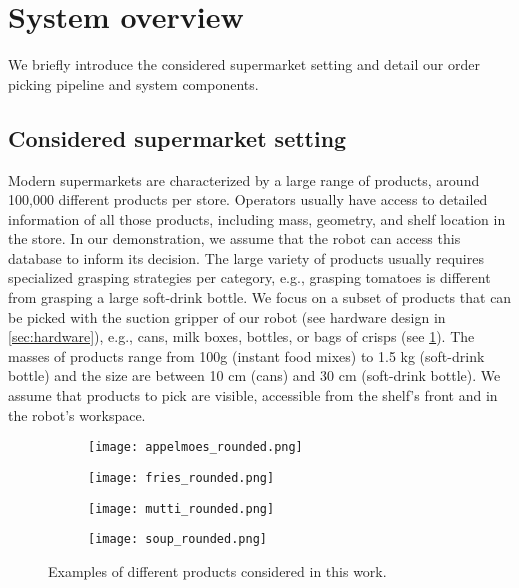 \section{System overview}

We briefly introduce the considered supermarket setting and
detail our order picking pipeline and system components.

\subsection{Considered supermarket setting}

Modern supermarkets are characterized by a large range of
products, around 100,000 different products per store.
Operators usually have access to detailed information of all
those products, including mass, geometry, and shelf location
in the store. In our demonstration, we assume that the robot
can access this database to inform its decision. The large
variety of products usually requires specialized grasping
strategies per category, e.g., grasping tomatoes is
different from grasping a large soft\hyp{}drink bottle. We focus
on a subset of products that can be picked with the suction
gripper of our robot (see hardware design in
\cref{sec:hardware}), e.g., cans, milk boxes, bottles, or
bags of crisps (see \cref{fig:product_examples}). The masses
of products range from 100g (instant food mixes) to 1.5 kg
(soft\hyp{}drink bottle) and the size are between 10 cm (cans)
and 30 cm (soft\hyp{}drink bottle). We assume that products to
pick are visible, accessible from the shelf's front and in the robot's workspace.
\begin{figure}[t]
  \centering
  \begin{subfigure}[b]{0.24\linewidth}
    \centering
    \texttt{[image: appelmoes\_rounded.png]}
  \end{subfigure}%
  \begin{subfigure}[b]{0.24\linewidth}
    \centering
    \texttt{[image: fries\_rounded.png]}
  \end{subfigure}%
  \begin{subfigure}[b]{0.24\linewidth}
    \centering
    \texttt{[image: mutti\_rounded.png]}
  \end{subfigure}%
  \begin{subfigure}[b]{0.24\linewidth}
    \centering
    \texttt{[image: soup\_rounded.png]}
  \end{subfigure}%
  \caption{Examples of different products considered in this
  work.}
  \label{fig:product_examples}
\end{figure}

